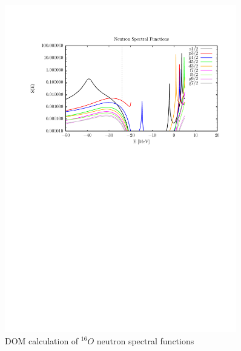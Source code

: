 \begin{figure}
\begin{center}
\includegraphics[width = 0.9\textwidth]{figures/o16_neutronSpectralFunctions.png}
\caption{DOM calculation of $^{16}O$ neutron spectral functions}
\label{o16NeutronSpectralFunctions}
\end{center}
\end{figure}

